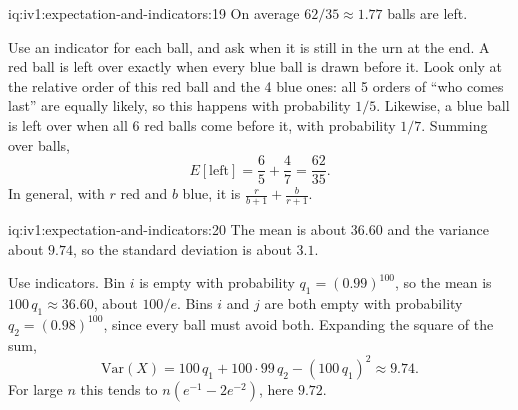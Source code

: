 \begin{solution}{iq:iv1:expectation-and-indicators:19}
On average $62/35 \approx 1.77$ balls are left.

Use an indicator for each ball, and ask when it is still in the urn at the end. A red ball is left over exactly when every blue ball is drawn before it. Look only
at the relative order of this red ball and the 4 blue ones: all 5 orders of ``who comes last'' are equally likely, so this happens with probability $1/5$. Likewise, a blue ball is left
over when all 6 red balls come before it, with probability $1/7$. Summing over balls,
\[
E[\text{left}] = \frac{6}{5} + \frac{4}{7} = \frac{62}{35}.
\]
In general, with $r$ red and $b$ blue, it is $\frac{r}{b+1} + \frac{b}{r+1}$.

\end{solution}

\begin{solution}{iq:iv1:expectation-and-indicators:20}
The mean is about $36.60$ and the variance about $9.74$, so the standard deviation is about $3.1$.

Use indicators. Bin $i$ is empty with probability $q_1 = (0.99)^{100}$, so the mean is $100\,q_1 \approx 36.60$, about $100/e$. Bins $i$ and $j$ are both empty with
probability $q_2 = (0.98)^{100}$, since every ball must avoid both. Expanding the square of the sum,
\[
\mathrm{Var}(X) = 100\,q_1 + 100 \cdot 99\, q_2 - (100\,q_1)^2 \approx 9.74.
\]
For large $n$ this tends to $n(e^{-1} - 2e^{-2})$, here $9.72$.

\end{solution}

